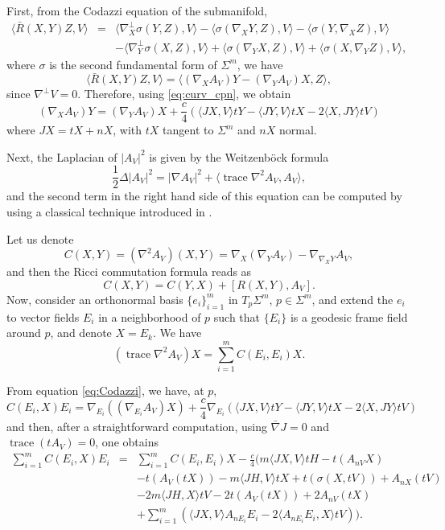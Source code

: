 \documentclass[11pt]{amsart}
\theoremstyle{plain}
\theoremstyle{definition}
\DeclareMathOperator{\trace}{trace} \DeclareMathOperator{\di}{div}
\numberwithin{equation}{section}
\begin{document}
First, from the Codazzi equation of the submanifold,
\begin{eqnarray*}
\langle \bar R(X,Y)Z,V\rangle&=&\langle\nabla^{\perp}_X\sigma(Y,Z),V\rangle-\langle\sigma(\nabla_XY,Z),V\rangle
-\langle\sigma(Y,\nabla_XZ),V\rangle\\&&-\langle\nabla^{\perp}_Y\sigma(X,Z),V\rangle+\langle\sigma(\nabla_YX,Z),V\rangle
+\langle\sigma(X,\nabla_YZ),V\rangle,
\end{eqnarray*}
where $\sigma$ is the second fundamental form of $\Sigma^m$, we have
\begin{equation*}
\langle \bar R(X,Y)Z,V\rangle=\langle(\nabla_XA_V)Y-(\nabla_YA_V)X,Z\rangle,
\end{equation*}
since $\nabla^{\perp}V=0$. Therefore, using \eqref{eq:curv_cpn}, we obtain
\begin{equation}\label{eq:Codazzi}
(\nabla_XA_V)Y=(\nabla_YA_V)X+\frac{c}{4}(\langle JX,V\rangle tY-\langle JY,V\rangle tX-2\langle X,JY\rangle tV)
\end{equation}
where $JX=tX+nX$, with $tX$ tangent to $\Sigma^m$ and $nX$ normal.

Next, the Laplacian of $|A_V|^2$ is given by the Weitzenb\"ock formula
\begin{equation}\label{eq:Laplacian}
\frac{1}{2}\Delta|A_V|^2=|\nabla A_V|^2+\langle\trace\nabla^2A_V,A_V\rangle,
\end{equation}
and the second term in the right hand side of this equation can
be computed by using a classical technique introduced in \cite[Section 1]{NS}.

Let us denote
$$
C(X,Y)=(\nabla^2 A_V)(X,Y)=\nabla_X(\nabla_YA_V)-\nabla_{\nabla_XY}A_V,
$$
and then the Ricci commutation formula reads as
\begin{equation}\label{eq:C} 
C(X,Y)=C(Y,X)+[R(X,Y),A_V].
\end{equation}
Now, consider an orthonormal basis $\{e_i\}_{i=1}^{m}$ in
$T_p\Sigma^m$, $p\in\Sigma^m$, and extend the $e_i$ to vector
fields $E_i$ in a neighborhood of $p$ such that $\{E_i\}$ is a
geodesic frame field around $p$, and denote $X=E_k$. We have
$$
(\trace\nabla^2A_V)X=\sum_{i=1}^mC(E_i,E_i)X.
$$

From equation \eqref{eq:Codazzi}, we have, at $p$, 
\begin{equation*}
C(E_i,X)E_i=\nabla_{E_i}((\nabla_{E_i}A_V)X)+\frac{c}{4}\nabla_{E_i}(\langle JX,V\rangle tY-\langle JY,V\rangle tX-2\langle X,JY\rangle tV)
\end{equation*}
and then, after a straightforward computation, using $\bar\nabla J=0$ and $\trace(tA_V)=0$, one obtains
\begin{eqnarray}\label{eq:1}
\sum_{i=1}^m C(E_i,X)E_i&=&\sum_{i=1}^m C(E_i,E_i)X-\frac{c}{4}\big(m\langle JX,V\rangle tH-t(A_{nV}X)\\\nonumber &&-t(A_V(tX))-m\langle JH,V\rangle tX+t(\sigma(X,tV))+A_{nX}(tV)\\\nonumber &&-2m\langle JH,X\rangle tV-2t(A_V(tX))+2A_{nV}(tX)\\\nonumber &&+\sum_{i=1}^m\left(\langle JX,V\rangle A_{nE_i}E_i-2\langle A_{nE_i}E_i,X\rangle tV\right)\big).
\end{eqnarray}
\end{document}

